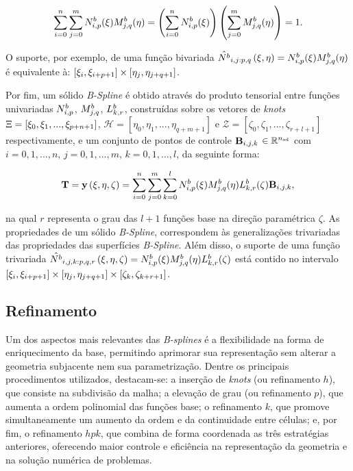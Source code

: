 \documentclass[tese_patricia]{subfiles}
\begin{document}
\begin{align}
 \sum_{i=0}^{n}\sum_{j=0}^{m}N^b_{i,p}(\xi)M^b_{j,q}(\eta) = \left(\sum_{i=0}^{n} N^b_{i,p}(\xi)\right) \left(\sum_{j=0}^{m} M^b_{j,q}(\eta)\right) = 1.
\end{align}

O suporte, por exemplo, de uma função bivariada $\hat{N^b}_{i,j:p,q}\left(\xi,\eta\right) = N^b_{i,p}(\xi)M^b_{j,q}(\eta)$ é equivalente à: $\left[\xi_{i},\xi_{i+p+1}\right]\times\left[\eta_{j},\eta_{j+q+1}\right]$.

Por fim, um sólido \textit{B-Spline} é obtido através do produto tensorial entre funções univariadas $N^b_{i,p}$, $M^b_{j,q}$, $L^b_{k,r}$, construídas sobre os vetores de \textit{knots} $\Xi = \left[\xi_{0},\xi_{1},...,\xi_{p+n+1}\right]$, $\mathcal{H} = \left[\eta_{0},\eta_{1},...,\eta_{q+m+1}\right]$ e $\mathcal{Z} = \left[\zeta_{0},\zeta_{1},...,\zeta_{r+l+1}\right]$ respectivamente, e um conjunto de pontos de controle  $\mathbf{B}_{i,j,k}$ $\in \mathbb{R}^{{n_{\mathrm{sd}}}}$ com $i = 0,1,...,n$, $j = 0,1,..., m$, $k = 0,1,..., l$, da seguinte forma:

\begin{align}
\mathbf{T} = \mathbf{y}\left(\xi,\eta,\zeta\right)  = \sum_{i=0}^{n}\sum_{j=0}^{m}\sum_{k=0}^{l}N^b_{i,p}(\xi)M^b_{j,q}(\eta)L^b_{k,r}(\zeta)\mathbf{B}_{i,j,k},
\end{align}

\noindent na qual $r$ representa o grau das $l+1$ funções base na direção paramétrica $\zeta$. As propriedades de um sólido \textit{B-Spline}, correspondem às generalizações trivariadas das propriedades das superfícies \textit{B-Spline}. Além disso, o suporte de uma função trivariada $\hat{N^b}_{i,j,k:p,q,r}\left(\xi,\eta,\zeta\right) = N^b_{i,p}(\xi)M^b_{j,q}(\eta)L^b_{k,r}(\zeta)$ está contido no intervalo $\left[\xi_{i},\xi_{i+p+1}\right]\times\left[\eta_{j},\eta_{j+q+1}\right]\times\left[\zeta_{k},\zeta_{k+r+1}\right]$.


\subsection{Refinamento}

Um dos aspectos mais relevantes das \textit{B-splines} é a flexibilidade na forma de enriquecimento da base, permitindo aprimorar sua representação sem alterar a geometria subjacente nem sua parametrização. Dentre os principais procedimentos utilizados, destacam-se: a inserção de \textit{knots} (ou refinamento $h$), que consiste na subdivisão da malha; a elevação de grau (ou refinamento $p$), que aumenta a ordem polinomial das funções base; o refinamento $k$, que promove simultaneamente um aumento da ordem e da continuidade entre células; e, por fim, o refinamento $hpk$, que combina de forma coordenada as três estratégias anteriores, oferecendo maior controle e eficiência na representação da geometria e na solução numérica de problemas.
\end{document}
